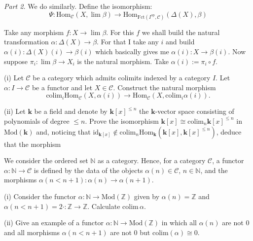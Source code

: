 \documentclass{category-template}
\begin{document}
\textit{Part 2.} We do similarly. Define the isomorphism:
\begin{equation*}
    \Psi: \text{Hom}_{\mathcal{C}}(X,\lim \beta) \to \text{Hom}_{\text{Fct}(I^{\text{op}}, \mathcal{C})}(\Delta(X), \beta)
\end{equation*}

Take any morphism $f: X \to \lim\beta$. For this $f$ we shall build the natural
transformation $\alpha: \Delta(X) \to \beta$. For that I take any $i$ and build
$\alpha(i): \Delta(X)(i) \to \beta(i)$ which basically gives me $\alpha(i): X
\to \beta(i)$. Now suppose $\pi_i: \lim\beta \to X_i$ is the natural morphism.
Take $\alpha(i) := \pi_i \circ f$. 

\begin{problem}
    (i) Let $\mathcal{C}$ be a category which admits colimits indexed by a category 
    $I$. Let $\alpha: I \to \mathcal{C}$ be a functor and let $X \in \mathcal{C}$.
    Construct the natural morphism
    \begin{equation*}
        \text{colim}_i \text{Hom}_{\mathcal{C}}(X,\alpha(i)) \to \text{Hom}_{\mathcal{C}}(X,\text{colim}_i \alpha(i)).
    \end{equation*}

    (ii) Let $\mathbf{k}$ be a field and denote by $\mathbf{k}[x]^{\leq n}$ the
    $\textbf{k}$-vector space consisting of polynomials of degree $\leq n$. Prove 
    the isomorphism $\mathbf{k}[x] \cong \text{colim}_n \mathbf{k}[x]^{\leq n}$ in 
    $\text{Mod}(\mathbf{k})$ and, noticing that $\text{id}_{\mathbf{k}[x]} \not\in \text{colim}_n \text{Hom}_{\mathbf{k}}(\mathbf{k}[x], \mathbf{k}[x]^{\leq n})$, 
    deduce that the morphism
\end{problem}

\begin{problem}
    We consider the ordered set $\mathbb{N}$ as a category. Hence, for a
category $\mathcal{C}$, a functor $\alpha: \mathbb{N} \to \mathcal{C}$ is
defined by the data of the objects $\alpha(n) \in \mathcal{C}$, $n \in
\mathbb{N}$, and the morphisms $\alpha(n<n+1): \alpha(n) \to \alpha(n+1)$. 

(i) Consider the functor $\alpha: \mathbb{N} \to \text{Mod}(\mathbb{Z})$ given
by $\alpha(n) = \mathbb{Z}$ and $\alpha(n<n+1)=2 \cdot: \mathbb{Z} \to
\mathbb{Z}$. Calculate $\text{colim}\, \alpha$.

(ii) Give an example of a functor $\alpha: \mathbb{N} \to
\text{Mod}(\mathbb{Z})$ in which all $\alpha(n)$ are not $0$ and all morphisms
$\alpha(n < n + 1)$ are not $0$ but $\text{colim}(\alpha) \cong 0$.
\end{problem}
\end{document}
